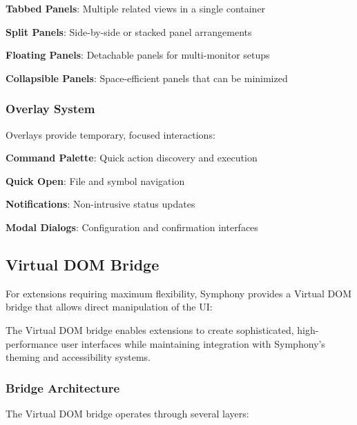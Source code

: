 \begin{compactlist}
    \item \textbf{Tabbed Panels}: Multiple related views in a single container
    \item \textbf{Split Panels}: Side-by-side or stacked panel arrangements
    \item \textbf{Floating Panels}: Detachable panels for multi-monitor setups
    \item \textbf{Collapsible Panels}: Space-efficient panels that can be minimized
\end{compactlist}

\subsubsection*{Overlay System}

Overlays provide temporary, focused interactions:

\begin{compactlist}
    \item \textbf{Command Palette}: Quick action discovery and execution
    \item \textbf{Quick Open}: File and symbol navigation
    \item \textbf{Notifications}: Non-intrusive status updates
    \item \textbf{Modal Dialogs}: Configuration and confirmation interfaces
\end{compactlist}

\subsection*{Virtual DOM Bridge}

For extensions requiring maximum flexibility, Symphony provides a Virtual DOM bridge that allows direct manipulation of the UI:

\begin{successbox}
The Virtual DOM bridge enables extensions to create sophisticated, high-performance user interfaces while maintaining integration with Symphony's theming and accessibility systems.
\end{successbox}

\subsubsection*{Bridge Architecture}

The Virtual DOM bridge operates through several layers:

